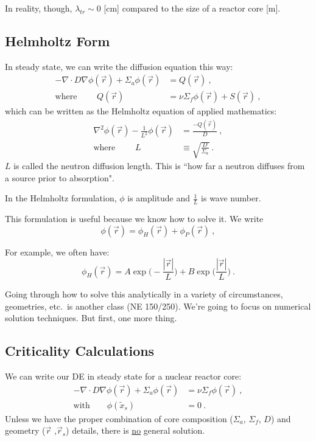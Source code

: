 \documentclass[12pt]{article}
\begin{document}
In reality, though, $\lambda_{tr} \sim 0$ [cm] compared to the size of a reactor core [m]. 


\subsection*{Helmholtz Form}
In steady state, we can write the diffusion equation this way:
%
\begin{align*}
-\nabla \cdot D\nabla \phi(\vec{r}) + 
\Sigma_a \phi(\vec{r}) &= Q(\vec{r})\:, \\
%
\text{where }\qquad Q(\vec{r}) &=
\nu \Sigma_f \phi(\vec{r}) +
S(\vec{r})\:,
\end{align*}
%
which can be written as the Helmholtz equation of applied mathematics:
%
\begin{align*}
\nabla^2 \phi(\vec{r}) - \frac{1}{L^2}\phi(\vec{r}) &= \frac{-Q(\vec{r})}{D}\:, \\
\text{where }\qquad L &\equiv \sqrt{\frac{D}{\Sigma_a}}\:.
\end{align*}
%
$L$ is called the neutron diffusion length. This is ``how far a neutron diffuses from a source prior to absorption". 

In the Helmholtz formulation, $\phi$ is amplitude and $\frac{1}{L}$ is wave number. 

This formulation is useful because we know how to solve it. We write
\[\phi(\vec{r}) = \phi_H(\vec{r}) + \phi_P(\vec{r}) \:,\]

For example, we often have:
\[\phi_H(\vec{r}) = A\exp\bigl(-\frac{|\vec{r}|}{L}\bigr) + B\exp\bigl(\frac{|\vec{r}|}{L}\bigr) \:.\]

Going through how to solve this analytically in a variety of circumstances, geometries, etc.\ is another class (NE 150/250). We're going to focus on numerical solution techniques. But first, one more thing.

\subsection*{Criticality Calculations}

We can write our DE in steady state for a nuclear reactor core:
%
\begin{align*}
-\nabla \cdot D\nabla \phi(\vec{r}) + 
\Sigma_a \phi(\vec{r}) &= \nu \Sigma_f \phi(\vec{r})\:, \\
\text{with} \qquad \phi(\tilde{x}_s) &= 0\:.
\end{align*}
%
Unless we have the proper combination of core composition ($\Sigma_a$, $\Sigma_f$, $D$) and geometry ($\vec{r}$ ,$\vec{r}_s$) details, there is \underline{no} general solution. 
\end{document}
